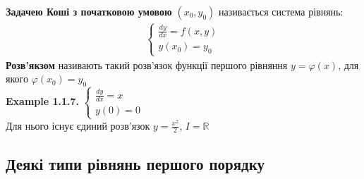 \documentclass[a4paper, 14pt]{extarticle}
\def\huge{\displaystyle}
\def\ex#1{\textbf{Example {#1}}}
\def\bigline{\vspace{5mm}\\}
\begin{document}
	\textbf{Задачею Коші з початковою умовою} $(x_0,y_0)$ називається система рівнянь:
	\begin{align*}
	\begin{cases}
	\displaystyle \frac{dy}{dx}=f(x,y)\\
	y(x_0)=y_0
	\end{cases}
	\end{align*}
	\textbf{Розв'якзом} називають такий розв'язок функції першого рівняння $y=\varphi(x)$, для якого $\varphi(x_0)=y_0$
	\bigline
	\ex{1.1.7.}
	$
	\begin{cases}
	\displaystyle \frac{dy}{dx}=x\\
	y(0)=0
	\end{cases}
	$\\
	Для нього існує єдиний розв'язок $\huge y = \frac{x^2}{2}$, $I=\mathbb{R}$
	\bigline
	
	\subsection{Деякі типи рівнянь першого порядку}
\end{document}
